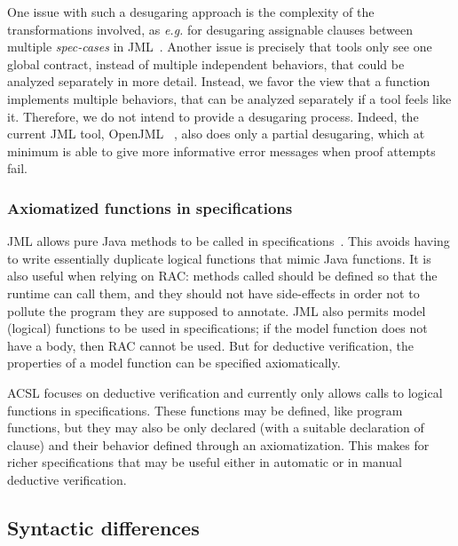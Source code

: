 One issue with such a desugaring approach is the complexity of the
transformations involved, as \emph{e.g.} for desugaring assignable clauses
between multiple \textit{spec-cases} in
JML~\cite{raghavan00desugaring}.  Another issue is precisely that
tools only see one global contract, instead of multiple independent
behaviors, that could be analyzed separately in more detail.
Instead, we favor the view that a function implements multiple
behaviors, that can be analyzed separately if a tool feels like
it. Therefore, we do not intend to provide a desugaring process.
Indeed, the current JML tool, OpenJML ~\cite{Cok-2011-OpenJML,Cok-2014-OpenJML}, also does only a partial desugaring, which at minimum is able to give more informative error messages when proof attempts fail.

\subsubsection*{Axiomatized functions in specifications}

JML allows pure Java methods to be called in
specifications~\cite{leavens00preliminary}. This avoids having
to write essentially duplicate logical functions that mimic Java functions. It is also useful when relying on RAC: methods called should be defined
so that the runtime can call them, and they should not have
side-effects in order not to pollute the program they are supposed to
annotate. 
JML also permits model (logical) functions to be
used in specifications; if the model function does not have
a body, then RAC cannot be used. But for deductive verification, 
the properties of a model function can be specified axiomatically.

ACSL focuses on deductive verification and currently only allows calls to logical functions in
specifications. These functions may be defined, like program functions, but
they may also be only declared (with a suitable declaration of \reads
clause) and their behavior defined through an axiomatization.
This makes for richer specifications that may be useful either in
automatic or in manual deductive verification.

\subsection{Syntactic differences}

